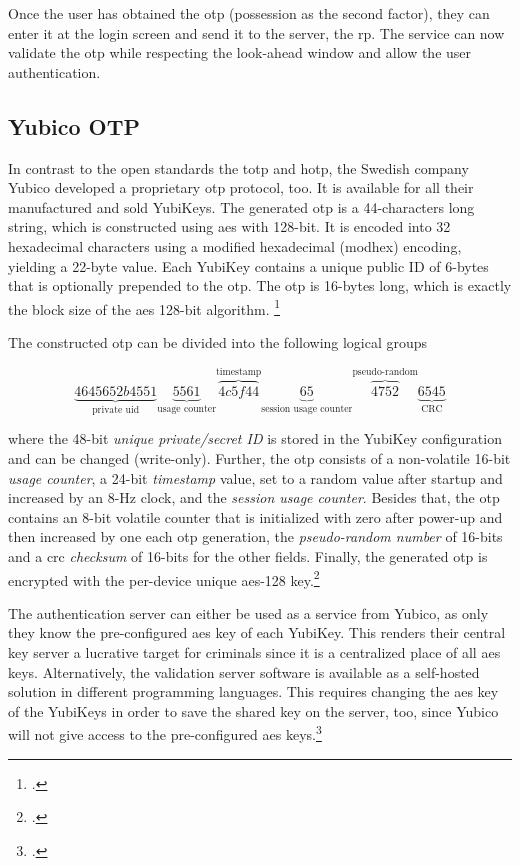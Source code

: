 Once the user has obtained the \gls{otp} (possession as the second factor), they can enter it at the login screen and send it to the server, the \gls{rp}. The service can now validate the \gls{otp} while respecting the look-ahead window and allow the user authentication.

\subsection{Yubico OTP}

In contrast to the open standards the \gls{totp} and \gls{hotp}, the Swedish company Yubico developed a proprietary \gls{otp} protocol, too. It is available for all their manufactured and sold YubiKeys. The generated \gls{otp} is a 44-characters long string, which is constructed using \gls{aes} with 128-bit. It is encoded into 32 hexadecimal characters using a modified hexadecimal (\frqq modhex\flqq) encoding, yielding a 22-byte value. Each YubiKey contains a unique public ID of 6-bytes that is optionally prepended to the \gls{otp}. The \gls{otp} is 16-bytes long, which is exactly the block size of the \gls{aes} 128-bit algorithm. \footcites[][]{10.1007/978-3-642-38004-4_17}[See][84--86]{Jacobs:2016:STA:2953926.2953927}

The constructed \gls{otp} can be divided into the following logical groups

\begin{equation*}
	\underbrace{4645652b4551}_\text{private uid}\underbrace{5561}_\text{usage counter}\overbrace{4c5f44}^\text{timestamp}\underbrace{65}_\text{session usage counter}\overbrace{4752}^\text{pseudo-random}\underbrace{6545}_\text{CRC}
\end{equation*}

where the 48-bit \textit{unique private/secret ID} is stored in the YubiKey configuration and can be changed (write-only). Further, the \gls{otp} consists of a non-volatile 16-bit \textit{usage counter}, a 24-bit \textit{timestamp} value, set to a random value after startup and increased by an 8-Hz clock, and the \textit{session usage counter}. Besides that, the \gls{otp} contains an 8-bit volatile counter that is initialized with zero after power-up and then increased by one each \gls{otp} generation, the \textit{pseudo-random number} of 16-bits and a \gls{crc} \textit{checksum} of 16-bits for the other fields. Finally, the generated \gls{otp} is encrypted with the per-device unique \gls{aes}-128 key.\footcites[See][8--9, 33--34]{yubico-otp}[See][209--210]{10.1007/978-3-642-41284-4_11}

The authentication server can either be used as a service from Yubico, as only they know the pre-configured \gls{aes} key of each YubiKey. This renders their central key server a lucrative target for criminals since it is a centralized place of all \gls{aes} keys. Alternatively, the validation server software is available as a self-hosted solution in different programming languages. This requires changing the \gls{aes} key of the YubiKeys in order to save the shared key on the server, too, since Yubico will not give access to the pre-configured \gls{aes} keys.\footcites[See][8--9]{yubico-cloud}
